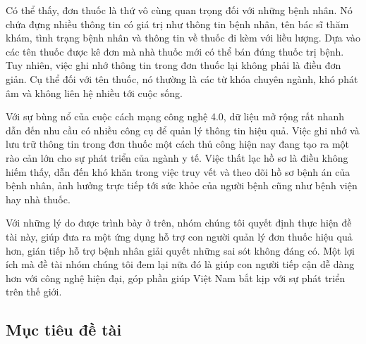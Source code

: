     Có thể thấy, đơn thuốc là thứ vô cùng quan trọng đối với những bệnh nhân. Nó chứa đựng nhiều thông tin có giá trị như thông tin bệnh nhân, tên bác sĩ thăm khám, tình trạng bệnh nhân và thông tin về thuốc đi kèm với liều lượng. Dựa vào các tên thuốc được kê đơn mà nhà thuốc mới có thể bán đúng thuốc trị bệnh. Tuy nhiên, việc ghi nhớ thông tin trong đơn thuốc lại không phải là điều đơn giản. Cụ thể đối với tên thuốc, nó thường là các từ khóa chuyên ngành, khó phát âm và không liên hệ nhiều tới cuộc sống.
    
    Với sự bùng nổ của cuộc cách mạng công nghệ 4.0, dữ liệu mở rộng rất nhanh dẫn đến nhu cầu có nhiều công cụ để quản lý thông tin hiệu quả. Việc ghi nhớ và lưu trữ thông tin trong đơn thuốc một cách thủ công hiện nay đang tạo ra một rào cản lớn cho sự phát triển của ngành y tế. Việc thất lạc hồ sơ là điều không hiếm thấy, dẫn đến khó khăn trong việc truy vết và theo dõi hồ sơ bệnh án của bệnh nhân, ảnh hưởng trực tiếp tới sức khỏe của người bệnh cũng như bệnh viện hay nhà thuốc.
    
    
    Với những lý do được trình bày ở trên, nhóm chúng tôi quyết định  thực hiện đề tài này, giúp đưa ra một ứng dụng hỗ trợ con người quản lý đơn thuốc hiệu quả hơn, gián tiếp hỗ trợ bệnh nhân giải quyết những sai sót không đáng có. Một lợi ích mà đề tài nhóm chúng tôi đem lại nữa đó là giúp con người tiếp cận dễ dàng hơn với công nghệ hiện đại, góp phần giúp Việt Nam bắt kịp với sự phát triển trên thế giới.

\subsection*{Mục tiêu đề tài}

